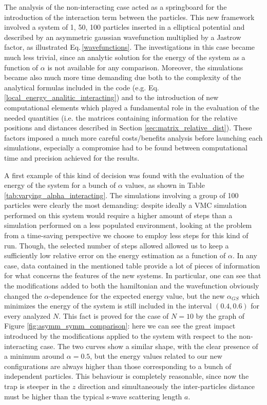 The analysis of the non-interacting case acted as a springboard for the introduction of the interaction term between the particles. This new framework involved a system of 1, 50, 100 particles inserted in a elliptical potential and described by an asymmetric gaussian wavefunction multiplied by a Jastrow factor, as illustrated Eq.\,\ref{wavefunctions}. The investigations in this case became much less trivial, since an analytic solution for the energy of the system as a function of $\alpha$ is not available for any comparison. Moreover, the simulations became also much more time demanding due both to the complexity of the analytical formulas included in the code (e.g. Eq.\,\ref{local_energy_analitic_interacting}) and to the introduction of new computational elements which played a fundamental role in the evaluation of the needed quantities (i.e. the matrices containing information for the relative positions and distances described in Section \ref{sec:matrix_relative_dist}). These factors imposed a much more careful costs/benefits analysis before launching each simulations, especially a compromise had to be found between computational time and precision achieved for the results. 

A first example of this kind of decision was found with the evaluation of the energy of the system for a bunch of $\alpha$ values, as shown in Table \ref{tab:varying_alpha_interacting}. The simulations involving a group of 100 particles were clearly the most demanding: despite ideally a VMC simulation performed on this system would require a higher amount of steps than a simulation performed on a less populated environment, looking at the problem from a time-saving perspective we choose to employ less steps for this kind of run. Though, the selected number of steps allowed allowed us to keep a sufficiently low relative error on the energy estimation as a function of $\alpha$. In any case, data contained in the mentioned table provide a lot of pieces of information for what concerns the features of the new systems. In particular, one can see that the modifications added to both the hamiltonian and the wavefunction obviously changed the $\alpha$-dependence for the expected energy value, but the new $\alpha_{GS}$ which minimizes the energy of the system is still included in the interval $(0.4, 0.6)$ for every analyzed $N$. This fact is proved for the case of $N=10$ by the graph of Figure \ref{fig:asymm_symm_comparison}: here we can see the great impact introduced by the modifications applied to the system with respect to the non-interacting case. The two curves show a similar shape, with the clear presence of a minimum around $\alpha=0.5$, but the energy values related to our new configurations are always higher than those corresponding to a bunch of independent particles. This behaviour is completely reasonable, since now the trap is steeper in the $z$ direction and simultaneously the inter-particles distance must be higher than the typical s-wave scattering length $a$. 


